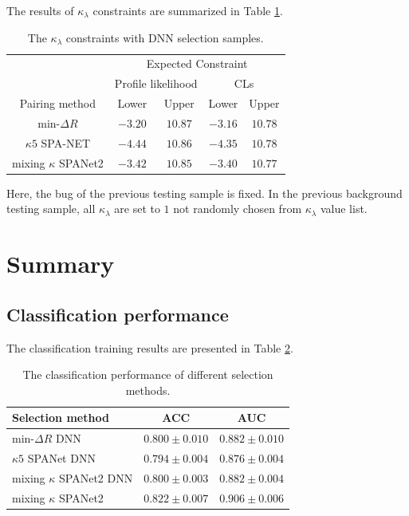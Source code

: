 \documentclass[12pt]{article}
\begin{document}
		The results of $\kappa_\lambda$ constraints are summarized in Table \ref{tab:kappa_constraint_DNN}. 
		\begin{table}[htpb]
			\centering
			\caption{The $\kappa_\lambda$ constraints with DNN selection samples.}
			\label{tab:kappa_constraint_DNN}
			\begin{tabular}{c|cc|cc}
								  & \multicolumn{4}{c}{Expected Constraint}                          \\
								  & \multicolumn{2}{c}{Profile likelihood} & \multicolumn{2}{c}{CLs} \\ \hline
			Pairing method        & Lower              & Upper             & Lower      & Upper      \\ \hline
			$\text{min-}\Delta R$ & $-3.20$            & $10.87$             & $-3.16$      & $10.78$    \\
			$\kappa 5$ SPA-NET    & $-4.44$            & $10.86$             & $-4.35$      & $10.78$   \\
			mixing $\kappa$ SPANet2& $-3.42$           & $10.85$             & $-3.40$      & $10.77$   
			\end{tabular}
		\end{table}

		Here, the bug of the previous testing sample is fixed. In the previous background testing sample, all $\kappa_\lambda$ are set to $1$ not randomly chosen from $\kappa_\lambda$ value list.
\section{Summary}%
\label{sec:summary}
	\subsection{Classification performance}%
	\label{sub:classification_performance}
		The classification training results are presented in Table \ref{tab:classification_results_summary2}.
		\begin{table}[htpb]
			\centering
			\caption{The classification performance of different selection methods.}
			\label{tab:classification_results_summary2}
			\begin{tabular}{l|cc}
			Selection method          & ACC   & AUC   \\ \hline
			$\text{min-}\Delta R$ DNN   & $0.800 \pm 0.010$ & $0.882 \pm 0.010$ \\
			$\kappa 5$ SPANet DNN       & $0.794 \pm 0.004$ & $0.876 \pm 0.004$ \\
			mixing $\kappa$ SPANet2 DNN & $0.800 \pm 0.003$ & $0.882 \pm 0.004$ \\
			mixing $\kappa$ SPANet2     & $0.822 \pm 0.007$ & $0.906 \pm 0.006$ 
			\end{tabular}			
		\end{table}
\end{document}
